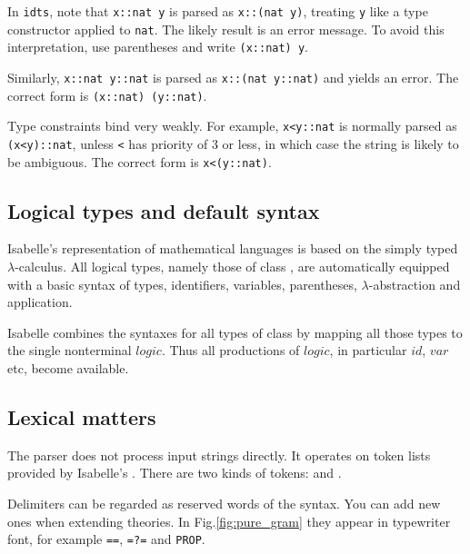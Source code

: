 \begin{warn}
  In {\tt idts}, note that \verb|x::nat y| is parsed as \verb|x::(nat y)|,
  treating {\tt y} like a type constructor applied to {\tt nat}.  The
  likely result is an error message.  To avoid this interpretation, use
  parentheses and write \verb|(x::nat) y|.

  Similarly, \verb|x::nat y::nat| is parsed as \verb|x::(nat y::nat)| and
  yields an error.  The correct form is \verb|(x::nat) (y::nat)|.
\end{warn}

\begin{warn}
  Type constraints bind very weakly. For example, \verb!x<y::nat! is normally
  parsed as \verb!(x<y)::nat!, unless \verb$<$ has priority of 3 or less, in
  which case the string is likely to be ambiguous. The correct form is
  \verb!x<(y::nat)!.
\end{warn}

\subsection{Logical types and default syntax}\label{logical-types}

Isabelle's representation of mathematical languages is based on the
simply typed $\lambda$-calculus.  All logical types, namely those of
class , are automatically equipped with a basic syntax of
types, identifiers, variables, parentheses, $\lambda$-abstraction and
application.
\begin{warn}
  Isabelle combines the syntaxes for all types of class  by
  mapping all those types to the single nonterminal $logic$.  Thus all
  productions of $logic$, in particular $id$, $var$ etc, become available.
\end{warn}


\subsection{Lexical matters}
The parser does not process input strings directly.  It operates on token
lists provided by Isabelle's .  There are two kinds of
tokens:  and .

Delimiters can be regarded as reserved words of the syntax.  You can
add new ones when extending theories.  In Fig.\ts\ref{fig:pure_gram} they
appear in typewriter font, for example {\tt ==}, {\tt =?=} and
{\tt PROP}\@.

